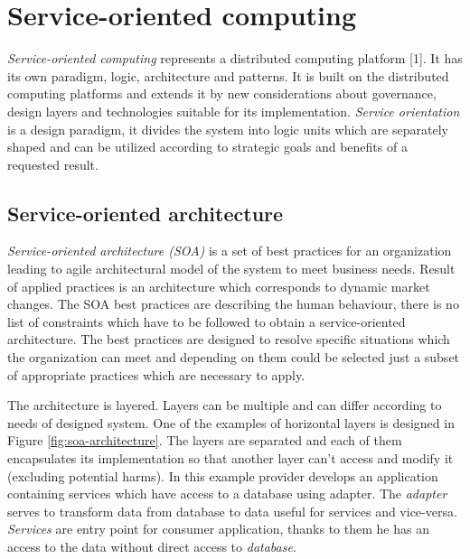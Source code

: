 \chapter{Service-oriented computing}
\label{chap:service-oriented computing}
\emph{Service-oriented computing} represents a distributed computing platform [1]. It has its own paradigm, logic, architecture and patterns. It is built on the distributed computing platforms and extends it by new considerations about governance, design layers and technologies suitable for its implementation.
\emph{Service orientation} is a design paradigm, it divides the system into logic units which are separately shaped and can be utilized according to strategic goals and benefits of a requested result.

\section{Service-oriented architecture}
\emph{Service-oriented architecture (SOA)} is a set of best practices for an organization leading to agile architectural model of the system to meet business needs. Result of applied practices is an architecture which corresponds to dynamic market changes. The SOA best practices are describing the human behaviour, there is no list of constraints which have to be followed to obtain a service-oriented architecture. The best practices are designed to resolve specific situations which the organization can meet and depending on them could be selected just a subset of appropriate practices which are necessary to apply.\par

The architecture is layered. Layers can be multiple and can differ according to needs of designed system. One of the examples of horizontal layers is designed in Figure \ref{fig:soa-architecture}. The layers are separated and each of them encapsulates its implementation so that another layer can't access and modify it (excluding potential harms). In this example provider develops an application containing services which have access to a database using adapter. The \textit{\gls{adapter}} serves to transform data from database to data useful for services and vice-versa. \textit{Services} are entry point for consumer application, thanks to them he has an access to the data without direct access to \textit{database}.

